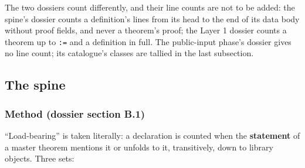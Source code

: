 The two dossiers count differently, and their line counts are not to be added: the spine's dossier counts a definition's lines from its head to the end of its data body without proof fields, and never a theorem's proof; the Layer 1 dossier counts a theorem up to \texttt{:=} and a definition in full. The public-input phase's dossier gives no line count; its catalogue's classes are tallied in the last subsection.

\subsection{The spine}\label{sec:gen-surface-spine}

\par{}\par

\subsubsection{Method (dossier section B.1)}\label{sec:gen-spine-B1}

\enquote{Load-bearing} is taken literally: a declaration is counted when the \textbf{statement} of a master theorem mentions it or unfolds to it, transitively, down to library objects. Three sets:

